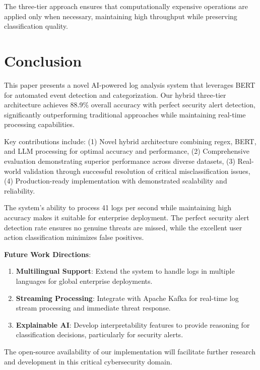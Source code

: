 \documentclass[conference]{IEEEtran}
\begin{document}
The three-tier approach ensures that computationally expensive operations are applied only when necessary, maintaining high throughput while preserving classification quality.

\section{Conclusion}

This paper presents a novel AI-powered log analysis system that leverages BERT for automated event detection and categorization. Our hybrid three-tier architecture achieves 88.9\% overall accuracy with perfect security alert detection, significantly outperforming traditional approaches while maintaining real-time processing capabilities.

Key contributions include: (1) Novel hybrid architecture combining regex, BERT, and LLM processing for optimal accuracy and performance, (2) Comprehensive evaluation demonstrating superior performance across diverse datasets, (3) Real-world validation through successful resolution of critical misclassification issues, (4) Production-ready implementation with demonstrated scalability and reliability.

The system's ability to process 41 logs per second while maintaining high accuracy makes it suitable for enterprise deployment. The perfect security alert detection rate ensures no genuine threats are missed, while the excellent user action classification minimizes false positives.

\textbf{Future Work Directions}:
\begin{enumerate}
\item \textbf{Multilingual Support}: Extend the system to handle logs in multiple languages for global enterprise deployments.
\item \textbf{Streaming Processing}: Integrate with Apache Kafka for real-time log stream processing and immediate threat response.
\item \textbf{Explainable AI}: Develop interpretability features to provide reasoning for classification decisions, particularly for security alerts.
\end{enumerate}

The open-source availability of our implementation will facilitate further research and development in this critical cybersecurity domain.
\end{document}
